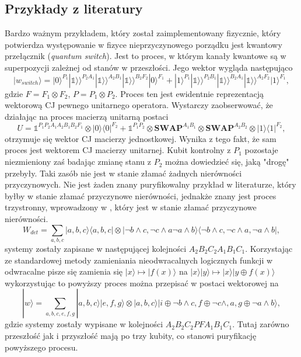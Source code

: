 \documentclass[10pt]{article} %
\newcommand{\Ket}[1]{|#1\rangle}
\newcommand{\Bra}[1]{\langle#1|}
\newcommand{\KKet}[1]{|#1\rangle\rangle}
\newcommand{\I}{\mathbb{1}}
\begin{document}
\subsection{Przykłady z literatury}
Bardzo ważnym przykładem, który został zaimplementowany fizycznie, który potwierdza występowanie w fizyce nieprzyczynowego porządku jest kwantowy przełącznik (\textit{quantum switch}). Jest to proces, w którym kanały kwantowe są w superpozycji zależnej od stanów w przeszłości. Jego wektor wygląda następująco
\begin{equation}
\Ket{w_{switch}} = \Ket{0}^{P_1}\KKet{\I}^{P_2A_1}\KKet{\I}^{A_2B_1}\KKet{\I}^{B_2F_2}\Ket{0}^{F_1}+\Ket{1}^{P_1}\KKet{\I}^{P_2B_1}\KKet{\I}^{B_2A_1}\KKet{\I}^{A_2F_2}\Ket{1}^{F_1},
\end{equation} gdzie $F = F_1 \otimes F_2$, $P = P_1 \otimes P_2$. Proces ten jest ewidentnie reprezentacją wektorową CJ pewnego unitarnego operatora. Wystarczy zaobserwować, że działając na proces macierzą unitarną postaci
\begin{equation}
U = \I^{P_1P_2A_1A_2B_1B_2F_1}\otimes\Ket{0}\Bra{0}^{F_2} + \I^{P_1P_2} \otimes \mathbf{SWAP}^{A_1B_1} \otimes \mathbf{SWAP}^{A_2B_2} \otimes \Ket{1}\Bra{1}^{F_2},
\end{equation}
otrzymuje się wektor CJ macierzy jednostkowej. Wynika z tego fakt, że sam proces jest wektorem CJ macierzy unitarnej.
Kubit kontrolny z $P_1$ pozostaje niezmieniony zaś badając zmianę stanu z $P_2$ można dowiedzieć się, jaką "drogę" przebyły. Taki zasób nie jest w stanie złamać żadnych nierówności przyczynowych.
Nie jest żaden znany puryfikowalny przykład w literaturze, który byłby w stanie złamać przyczynowe nierówności, jednakże znany jest proces trzystronny, wprowadzony w \cite{logic}, który jest w stanie złamać przyczynowe nierówności. 
\begin{equation}
W_{det} = \sum_{a,b,c} \Ket{a,b,c}\Bra{a,b,c} \otimes \Ket{\neg b \land c, \neg c\land a \neg a\land b} \Bra{\neg b \land c, \neg c\land a ,\neg a\land b},
\end{equation} systemy zostały zapisane w następującej kolejności $A_2B_2C_2A_1B_1C_1$. Korzystając ze standardowej metody zamieniania nieodwracalnych logicznych funkcji w odwracalne pisze się zamienia się
$\Ket{x} \mapsto \Ket{f(x)}$ na $\Ket{x}\Ket{y} \mapsto \Ket{x}\Ket{y \oplus f(x)}$ wykorzystując to powyższy proces można przepisać w postaci wektorowej na
\begin{equation}
\Ket{w} = \sum_{a,b,c,e,f,g} \Ket{a,b,c}\Ket{e,f,g} \otimes \Ket{a,b,c}\Ket{i \oplus \neg b \land c,f \oplus \neg c\land, a , g\oplus \neg a\land b},
\end{equation} gdzie systemy zostały wypisane w kolejności $A_2B_2C_2PFA_1B_1C_1$. Tutaj zarówno przeszłość jak i przyszłość mają po trzy kubity, co stanowi puryfikację powyższego procesu.
\end{document}
